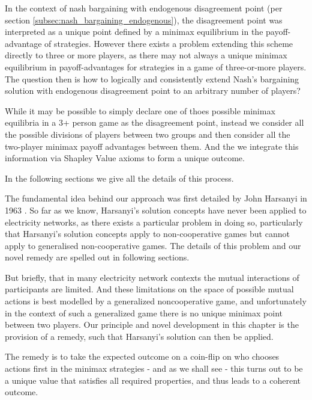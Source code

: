In the context of nash bargaining with endogenous disagreement point (per section \ref{subsec:nash_bargaining_endogenous}), the disagreement point was interpreted as a unique point defined by a minimax equilibrium in the payoff-advantage of strategies.
However there exists a problem extending this scheme directly to three or more players, as there may not always a unique minimax equilibrium in payoff-advantages for strategies in a game of three-or-more players.
The question then is how to logically and consistently extend Nash's bargaining solution with endogenous disagreement point to an arbitrary number of players?

While it may be possible to simply declare one of thoes possible minimax equilibria in a 3+ person game as the disagreement point, 
instead we consider all the possible divisions of players between two groups and then consider all the two-player minimax payoff advantages between them. And the we integrate this information via Shapley Value axioms to form a unique outcome.

In the following sections we give all the details of this process.%

The fundamental idea behind our approach was first detailed by John Harsanyi in 1963 \cite{values3}.
So far as we know, Harsanyi's solution concepts have never been applied to electricity networks, as there exists a particular problem in doing so, particularly that Harsanyi's solution concepts apply to non-cooperative games but cannot apply to generalised non-cooperative games.
The details of this problem and our novel remedy are spelled out in following sections.

But briefly, that in many electricity network contexts the mutual interactions of participants are limited.
And these limitations on the space of possible mutual actions is best modelled by a generalized noncooperative game, and unfortunately in the context of such a generalized game there is no unique minimax point between two players.
Our principle and novel development in this chapter is the provision of a remedy, such that Harsanyi's solution can then be applied.

The remedy is to take the expected outcome on a coin-flip on who chooses actions first in the minimax strategies - and as we shall see - this turns out to be a unique value that satisfies all required properties, and thus leads to a coherent outcome.


